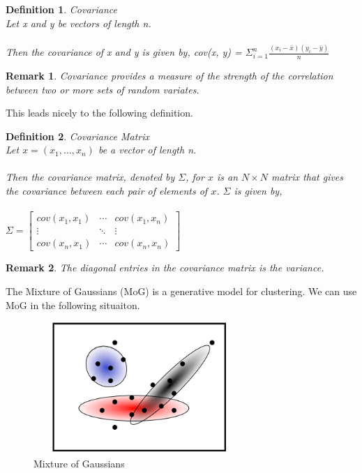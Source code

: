 \documentclass{article}
\newtheorem{definition}{Definition}[subsection]
\newtheorem*{remark}{Remark}
\begin{document}
\begin{definition}{Covariance}
\\
Let x and y be vectors of length n.
\\\\
Then the covariance of x and y is given by, cov(x, y) = $\Sigma_{i=1}^{n} {\frac{(x_i - \bar{x})(y_i - \bar{y})}{n}}$
\end{definition}

\begin{remark}
Covariance provides a measure of the strength of the correlation between two or more sets of random variates.
\end{remark}
\noindent This leads nicely to the following definition.

\begin{definition}{Covariance Matrix}
\\
Let $x=(x_1, ..., x_n)$ be a vector of length n.
\\\\
Then the covariance matrix, denoted by $\Sigma$, for $x$ is an $N \times N$ matrix that gives the covariance between each pair of elements of $x$. $\Sigma$ is given by,
\\\\
$
\Sigma = \begin{bmatrix}
cov(x_1,x_1) & \cdots & cov(x_1, x_n)\\
\vdots & \ddots & \vdots\\
cov(x_n, x_1) & \cdots & cov(x_n, x_n)
\end{bmatrix}
$
\end{definition}

\begin{remark}
The diagonal entries in the covariance matrix is the variance.
\end{remark}

\noindent The Mixture of Gaussians (MoG) is a generative model for clustering. We can use MoG in the following situaiton.

\begin{figure}[htp]
    \centering
    \includegraphics[width=8cm, height=5cm]{slide_29_1}
    \caption{Mixture of Gaussians}
    \label{fig:Slide29_1}
\end{figure}
\end{document}
